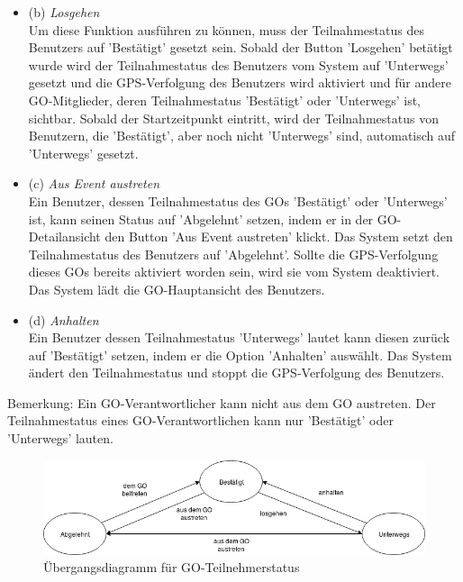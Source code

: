 \documentclass[parskip=full]{scrartcl}
\def\threedigits#1{%
  \ifnum#1<100 0\fi
  \ifnum#1<10 0\fi
  \number#1}
\begin{document}
\begin{enumerate}[label={\textbf{/F\protect\threedigits{\theenumi}0/}}, leftmargin=*, resume]
\begin{itemize}
	\item (b) \textit{Losgehen}\label{losgehen} \\
	Um diese Funktion ausführen zu können, muss der Teilnahmestatus des Benutzers auf 'Bestätigt' gesetzt sein. Sobald der Button 'Losgehen' betätigt wurde wird der Teilnahmestatus des Benutzers vom System auf 'Unterwegs' gesetzt und die GPS-Verfolgung des Benutzers wird aktiviert und für andere GO-Mitglieder, deren Teilnahmestatus 'Bestätigt' oder 'Unterwegs' ist, sichtbar. Sobald der Startzeitpunkt eintritt, wird der Teilnahmestatus von Benutzern, die 'Bestätigt', aber noch nicht 'Unterwegs' sind, automatisch auf 'Unterwegs' gesetzt.
	
	\item (c) \textit{Aus Event austreten}\label{austreten} \\
Ein Benutzer, dessen Teilnahmestatus des GOs 'Bestätigt' oder 'Unterwegs' ist, kann seinen Status auf 'Abgelehnt' setzen, indem er in der GO-Detailansicht den Button 'Aus Event austreten' klickt. Das System setzt den Teilnahmestatus des Benutzers auf 'Abgelehnt'. Sollte die GPS-Verfolgung dieses GOs bereits aktiviert worden sein, wird sie vom System deaktiviert. Das System lädt die GO-Hauptansicht des Benutzers.
	
	\item (d) \textit{Anhalten}\label{anhalten} \\
	Ein Benutzer dessen Teilnahmestatus 'Unterwegs' lautet kann diesen zurück auf 'Bestätigt' setzen, indem er die Option 'Anhalten' auswählt. Das System ändert den Teilnahmestatus und stoppt die GPS-Verfolgung des Benutzers.
	
	\end{itemize}
	
	Bemerkung: Ein GO-Verantwortlicher kann nicht aus dem GO austreten. Der Teilnahmestatus eines GO-Verantwortlichen kann nur 'Bestätigt' oder 'Unterwegs' lauten.\\
	
	\begin{figure}[H]
		\centering
			\includegraphics[scale=0.55]{res/Teilnahmestatus.png}
		\caption{Übergangsdiagramm für GO-Teilnehmerstatus}	
	\end{figure}
	

\end{enumerate}
\end{document}
